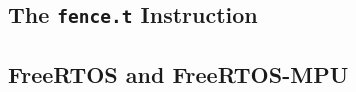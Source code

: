 
\subsection{The \texttt{fence.t} Instruction}
\label{sub:fence_t}


\subsection{FreeRTOS and FreeRTOS-MPU}
\label{sub:freertos}

